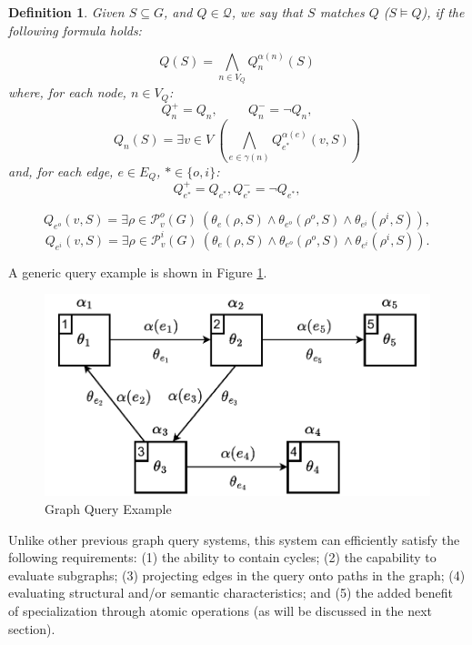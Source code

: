 \documentclass[mathematics,article,submit,pdftex,moreauthors]{Definitions/mdpi}
\newtheorem{definition}{Definition}[section]
\begin{document}
\begin{definition}{}
    Given $S\subseteq G$, and $Q\in \mathcal{Q}$, we say that $S$ \emph{matches} $Q$ ($S\vDash Q$), if the following formula holds:

    $$Q(S)=\bigwedge_{n\in V_Q} Q_n^{\alpha(n)}(S)$$
		where, for each node, $n\in V_Q$:	        
		$$Q_n^+ = Q_n,\hspace{1cm} Q_n^- = \neg Q_n,$$                	        
		$$Q_n(S)=\exists v\in V\ \left(\bigwedge_{e\in \gamma(n)} Q_{e^*}^{\alpha(e)}(v,S)\right)$$	        
	    and, for each edge, $e\in E_Q$, $*\in \{o,i\}$:
	    $$Q_{e^*}^+ = Q_{e^*}, Q_{e^*}^- = \neg Q_{e^*},$$

        $$Q_{e^o}(v,S)=\exists \rho\in \mathcal{P}_v^o(G)\ \left(\theta_e(\rho,S)\wedge \theta_{e^o}(\rho^o,S) \wedge \theta_{e^i}(\rho^i,S)\right),$$
        $$Q_{e^i}(v,S)=\exists \rho\in \mathcal{P}_v^i(G)\ \left(\theta_e(\rho,S)\wedge \theta_{e^o}(\rho^o,S) \wedge \theta_{e^i}(\rho^i,S)\right).$$

\end{definition}\medskip


A generic query example is shown in Figure \ref{abstractpqg}.

\begin{figure}[h!]
    \begin{center}
        \includegraphics[scale=0.5]{png/Fig1.pdf}
    \end{center}
    \caption{%
        Graph Query Example
    }%
    \label{abstractpqg}
\end{figure}

Unlike other previous graph query systems, this system can efficiently satisfy the following requirements: (1) the ability to contain cycles; (2) the capability to evaluate subgraphs; (3) projecting edges in the query onto paths in the graph; (4) evaluating structural and/or semantic characteristics; and (5) the added benefit of specialization through atomic operations (as will be discussed in the next section).
\end{document}
